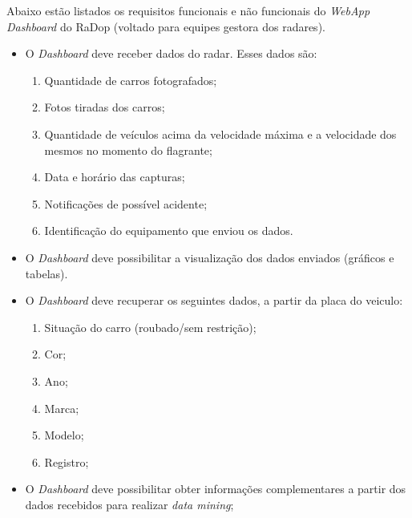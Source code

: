Abaixo estão listados os requisitos funcionais e não funcionais do \textit{WebApp Dashboard} do RaDop (voltado para equipes gestora dos radares).

\begin{itemize}
    \item O \textit{Dashboard} deve receber dados do radar. Esses dados são:
    \begin{enumerate}
        \item Quantidade de carros fotografados;
        \item Fotos tiradas dos carros;
        \item Quantidade de veículos acima da velocidade máxima e a velocidade dos mesmos no momento do flagrante;
        \item Data e horário das capturas;
        \item Notificações de possível acidente;
        \item Identificação do equipamento que enviou os dados.
    \end{enumerate}
\end{itemize}

\begin{itemize}
    \item O \textit{Dashboard} deve possibilitar a visualização dos dados enviados (gráficos e tabelas).
\end{itemize}

\begin{itemize}
    \item O \textit{Dashboard} deve recuperar os seguintes dados, a partir da placa do veiculo:
    \begin{enumerate}
        \item Situação do carro (roubado/sem restrição);
        \item Cor;
        \item Ano;
        \item Marca;
        \item Modelo;
        \item Registro;
    \end{enumerate}
\end{itemize}

\begin{itemize}
    \item O \textit{Dashboard} deve possibilitar obter informações complementares a partir dos dados recebidos para realizar \textit{data mining};
\end{itemize}

